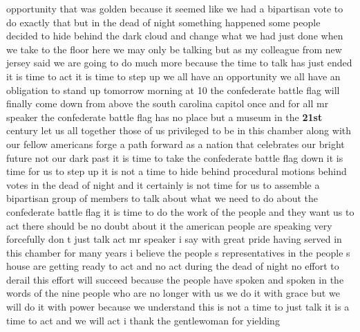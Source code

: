 \documentclass{article}
\begin{document}
opportunity that was golden because it seemed like we had a bipartisan vote to do exactly that but in the dead of night something happened some people decided to hide behind the dark cloud and change what we had just done when we take to the floor here we may only be talking but as my colleague from new jersey said we are going to do much more because the time to talk has just ended it is time to act it is time to step up we all have an opportunity we all have an obligation to stand up tomorrow morning at 10 the confederate battle flag will finally come down from above the south carolina capitol once and for all mr speaker the confederate battle flag has no place but a museum in the {\bf \color{red} 21st} century let us all together those of us privileged to be in this chamber along with our fellow americans forge a path forward as a nation that celebrates our bright future not our dark past it is time to take the confederate battle flag down it is time for us to step up it is not a time to hide behind procedural motions behind votes in the dead of night and it certainly is not time for us to assemble a bipartisan group of members to talk about what we need to do about the confederate battle flag it is time to do the work of the people and they want us to act there should be no doubt about it the american people are speaking very forcefully don t just talk act mr speaker i say with great pride having served in this chamber for many years i believe the people s representatives in the people s house are getting ready to act and no act during the dead of night no effort to derail this effort will succeed because the people have spoken and spoken in the words of the nine people who are no longer with us we do it with grace but we will do it with power because we understand this is not a time to just talk it is a time to act and we will act i thank the gentlewoman for yielding\pagebreak
\end{document}
